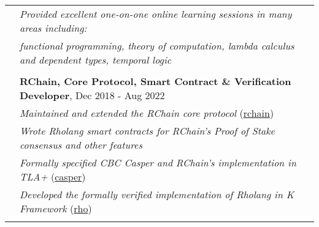 \documentclass[letterpaper,10pt,oneside]{article}
\begin{document}
\begin{tabular}{@{} l l}
 & \emph{Provided excellent one-on-one online learning sessions in many areas including:} \\
 & \emph{functional programming, theory of computation, lambda calculus and dependent types, temporal logic} \\
 & \\
 & \textbf{RChain, Core Protocol, Smart Contract \& Verification Developer}, Dec 2018 - Aug 2022 \\
 & \emph{Maintained and extended the RChain core protocol} (\href{https://github.com/rchain/rchain}{rchain}) \\
 & \emph{Wrote Rholang smart contracts for RChain's Proof of Stake consensus and other features} \\
 & \emph{Formally specified CBC Casper and RChain's implementation in TLA+} (\href{https://github.com/Isaac-DeFrain/TLAplus/tree/master/Casper}{casper}) \\
 & \emph{Developed the formally verified implementation of Rholang in K Framework} (\href{https://github.com/Isaac-DeFrain/KFramework/tree/master/Languages/GroundedRho}{rho}) \\
 & \\
\end{tabular}

\vfill

\newpage
\end{document}

